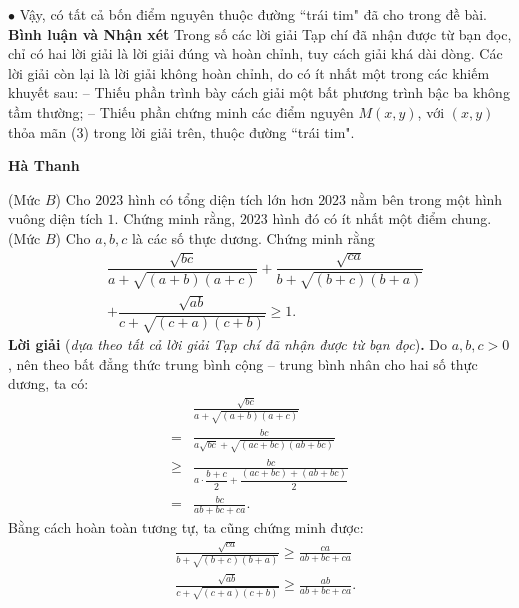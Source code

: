 \begin{multicols}{2}
	\vskip 0.05cm
	$\bullet$ Vậy, có tất cả bốn điểm nguyên thuộc đường ``trái tim" đã cho trong đề bài.
	\vskip 0.05cm
	\textbf{\color{thachthuctoanhoc}Bình luận và Nhận xét}
	\vskip 0.05cm
	Trong số các lời giải Tạp chí đã nhận được từ bạn đọc, chỉ có hai lời giải là lời giải đúng và hoàn chỉnh, tuy cách giải khá dài dòng. Các lời giải còn lại là lời giải không hoàn chỉnh, do có ít nhất một trong các khiếm khuyết sau:
	\vskip 0.05cm
	-- Thiếu phần trình bày cách giải một bất phương trình bậc ba không tầm thường;
	\vskip 0.05cm
	-- Thiếu phần chứng minh các điểm nguyên $M(x, y)$, với $(x, y)$ thỏa mãn ($3$) trong lời giải trên, thuộc đường ``trái tim".
	\begin{flushright}
		\textbf{\color{thachthuctoanhoc}Hà Thanh}
	\end{flushright}
	{}
	(Mức $B$) Cho $2023$ hình có tổng diện tích lớn hơn $2023$ nằm bên trong một hình vuông diện tích $1$. Chứng minh rằng, $2023$ hình đó có ít nhất một điểm chung.
	\vskip 0.05cm
	{}
	(Mức $B$) Cho $a,b,c$ là các số thực dương. Chứng minh rằng
	\begin{align*}
		&\dfrac{\sqrt{b c}}{a\!+\!\sqrt{(a\!+\!b)(a\!+\!c)}}+\dfrac{\sqrt{c a}}{b+\sqrt{(b+c)(b+a)}}\\
		&+\dfrac{\sqrt{a b}}{c+\sqrt{(c+a)(c+b)}} \geq 1.
	\end{align*}
	\textbf{\color{thachthuctoanhoc}Lời giải} (\textit{dựa theo tất cả lời giải Tạp chí đã nhận được từ bạn đọc})\textbf{\color{thachthuctoanhoc}.}
	\vskip 0.05cm
	Do $a, b, c > 0$, nên theo bất đẳng thức trung bình cộng -- trung bình nhân cho hai số thực dương, ta có:
	\begin{align*}
			&\frac{{\sqrt {bc} }}{{a + \sqrt {\left( {a + b} \right)\left( {a + c} \right)} }} \\
			= &\frac{{bc}}{{a\sqrt {bc}  + \sqrt {\left( {ac + bc} \right)\left( {ab + bc} \right)} }}\\
			 \ge &\frac{{bc}}{{a \cdot \dfrac{{b + c}}{2} + \dfrac{{\left( {ac + bc} \right) + \left( {ab + bc} \right)}}{2}}}\\
			 = &\frac{{bc}}{{ab + bc + ca}}.
	\end{align*}
	Bằng cách hoàn toàn tương tự, ta cũng chứng minh được:
	\begin{align*}
		&\frac{{\sqrt {ca} }}{{b + \sqrt {\left( {b + c} \right)\left( {b + a} \right)} }} \ge \frac{{ca}}{{ab + bc + ca}}\\
		&\frac{{\sqrt {ab} }}{{c + \sqrt {\left( {c + a} \right)\left( {c + b} \right)} }} \ge \frac{{ab}}{{ab + bc + ca}}.

\end{align*}
\end{multicols}
